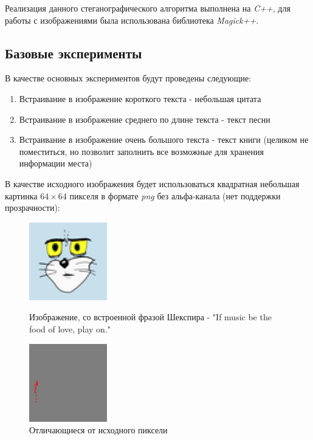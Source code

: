 \documentclass[a4paper]{article}
\begin{document}
  Реализация данного стеганографического алгоритма выполнена на \textit{C++},
  для работы с изображениями была использована библиотека \textit{Magick++}.

  \subsection{Базовые эксперименты}

  В качестве основных экспериментов будут проведены следующие:
  \begin{enumerate}
    \item Встраивание в изображение короткого текста - небольшая цитата
    \item Встраивание в изображение среднего по длине текста - текст песни
    \item Встраивание в изображение очень большого текста - текст книги (целиком не поместиться, но позволит заполнить все возможные для хранения информации места)
  \end{enumerate}

  В качестве исходного изображения будет использоваться квадратная небольшая картинка $64\times{64}$ пикселя
  в формате \textit{png} без альфа-канала (нет поддержки прозрачности):

  \begin{figure}[H]
    \centering
    \begin{minipage}[t]{0.4\textwidth}
        \centering
        \includegraphics{stego_1}
        \caption{Изображение, со встроенной фразой Шекспира - "If music be the food of love, play on."}
    \end{minipage}
    \hfill
    \begin{minipage}[t]{0.4\textwidth}
        \centering
        \includegraphics{diff_1}
        \caption{Отличающиеся от исходного пиксели} 
    \end{minipage}
  \end{figure}
  
\end{document}

